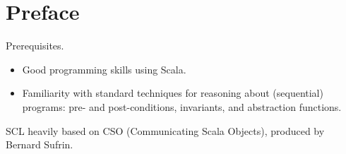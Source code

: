 \chapter*{Preface}



Prerequisites.

\begin{itemize}
\item Good programming skills using Scala. 


\item Familiarity with standard techniques for reasoning about (sequential)
programs:  pre- and post-conditions, invariants, and abstraction functions.
\end{itemize}


SCL heavily based on CSO (Communicating Scala Objects), produced by Bernard
Sufrin.
